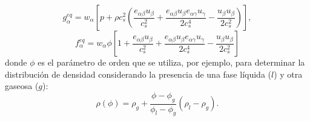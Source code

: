 \begin{equation}
	g_{\alpha}^{eq} = w_{\alpha}\left[ p + \rho c_s^2 \left( \dfrac{e_{{\alpha}\beta}u_{\beta}}{c_s^2}  + \dfrac{e_{\alpha\beta}u_{\beta}e_{{\alpha}\gamma}u_{\gamma}}{2c_s^4} - \dfrac{u_{\beta}u_{\beta}}{2c_s^2} \right)  \right],
\end{equation}
\begin{equation}
	f_{\alpha}^{eq} = w_{\alpha} \phi \left[ 1 + \dfrac{e_{{\alpha}\beta}u_{\beta}}{c_s^2}  + \dfrac{e_{\alpha\beta}u_{\beta}e_{{\alpha}\gamma}u_{\gamma}}{2c_s^4} - \dfrac{u_{\beta}u_{\beta}}{2c_s^2}  \right]
\end{equation}
donde $\phi$ es el par\'ametro de orden que se utiliza, por ejemplo, para determinar la distribuci\'on de densidad considerando la presencia de una fase l\'iquida ($l$) y otra gaseosa ($g$):
\begin{equation}
	\rho(\phi) = \rho_g + \dfrac{\phi - \phi_g}{\phi_l - \phi_g}(\rho_l - \rho_g).
\end{equation}

